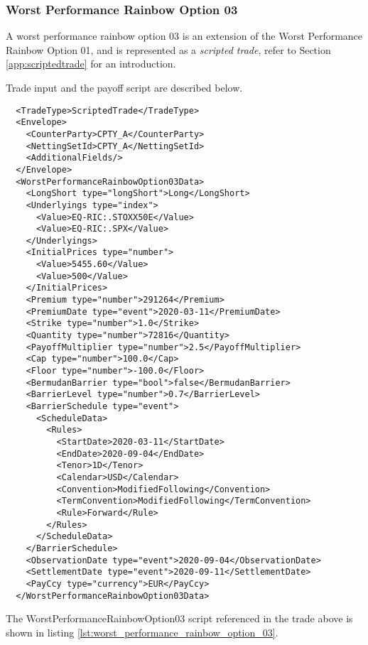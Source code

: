 \subsubsection*{Worst Performance Rainbow Option 03}

A worst performance rainbow option 03 is an extension of the Worst Performance Rainbow Option 01, and is
represented as a {\em scripted trade}, refer to Section \ref{app:scriptedtrade} for an introduction.

Trade input and the payoff script are described below.

\begin{verbatim}
  <TradeType>ScriptedTrade</TradeType>
  <Envelope>
    <CounterParty>CPTY_A</CounterParty>
    <NettingSetId>CPTY_A</NettingSetId>
    <AdditionalFields/>
  </Envelope>
  <WorstPerformanceRainbowOption03Data>
    <LongShort type="longShort">Long</LongShort>
    <Underlyings type="index">
      <Value>EQ-RIC:.STOXX50E</Value>
      <Value>EQ-RIC:.SPX</Value>
    </Underlyings>
    <InitialPrices type="number">
      <Value>5455.60</Value>
      <Value>500</Value>
    </InitialPrices>
    <Premium type="number">291264</Premium>
    <PremiumDate type="event">2020-03-11</PremiumDate>
    <Strike type="number">1.0</Strike>
    <Quantity type="number">72816</Quantity>
    <PayoffMultiplier type="number">2.5</PayoffMultiplier>
    <Cap type="number">100.0</Cap>
    <Floor type="number">-100.0</Floor>
    <BermudanBarrier type="bool">false</BermudanBarrier>
    <BarrierLevel type="number">0.7</BarrierLevel>
    <BarrierSchedule type="event">
      <ScheduleData>
        <Rules>
          <StartDate>2020-03-11</StartDate>
          <EndDate>2020-09-04</EndDate>
          <Tenor>1D</Tenor>
          <Calendar>USD</Calendar>
          <Convention>ModifiedFollowing</Convention>
          <TermConvention>ModifiedFollowing</TermConvention>
          <Rule>Forward</Rule>
        </Rules>
      </ScheduleData>
    </BarrierSchedule>
    <ObservationDate type="event">2020-09-04</ObservationDate>
    <SettlementDate type="event">2020-09-11</SettlementDate>
    <PayCcy type="currency">EUR</PayCcy>
  </WorstPerformanceRainbowOption03Data>
\end{verbatim}

The WorstPerformanceRainbowOption03 script referenced in the trade above is shown in listing
\ref{lst:worst_performance_rainbow_option_03}.

